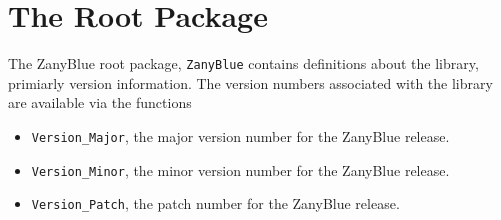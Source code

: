 %
%
%
%
%
%
%
%

\chapter{The Root Package}

The ZanyBlue root package, \texttt{ZanyBlue} contains definitions
about the library, primiarly version information.  The version
numbers associated with the library are available via the
functions
\begin{itemize}
\item \texttt{Version\_Major}, the major version number for the ZanyBlue
      release.
\item \texttt{Version\_Minor}, the minor version number for the ZanyBlue
      release.
\item \texttt{Version\_Patch}, the patch number for the ZanyBlue release.
\end{itemize}

